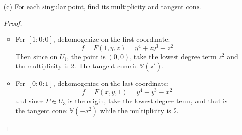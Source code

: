 \documentclass{article}
\begin{document}
\begin{itemize}
\begin{proof}
\begin{itemize}
                        \item If from $F_{x} = 0$, we get $z = 0$, then 
                            \begin{equation*}
                                F_{z}(x, y, 0) = y^{3} = 0
                            \end{equation*}
                        so $y  = 0$ also. Then the singular point is $[1 : 0 : 0]$. Notice that both $x = z = 0$ cannot be the case, because then we would get $x = y = z = 0$ which is not a point.
                    \end{itemize}
                So the singular points of $\mathbb{V}(F)$ are $[0 : 0 : 1]$ and $[1 : 0 : 0]$.
            \end{proof}

        \item [(c)] For each singular point, find its multiplicity and tangent cone. 
            \begin{proof}
                \begin{itemize}
                    \item For $[1 : 0 : 0]$, dehomogenize on the first coordinate:
                        \begin{equation*}
                            f = F(1, y, z) = y^{4} + zy^{3} - z^{2}
                        \end{equation*}
                    Then since on $U_{1}$, the point is $(0, 0)$, take the lowest degree term $z^{2}$ and the multiplicity is $2$. The tangent cone is $\mathbb{V}(z^{2})$.

                    \item For $[0 :0 : 1]$, dehomogenize on the last coordinate:
                        \begin{equation*}
                            f = F(x, y, 1) = y^{4} + y^{3} - x^{2}
                        \end{equation*}
                    and since $P \in U_{3}$ is the origin, take the lowest degree term, and that is the tangent cone: $\mathbb{V}(-x^{2})$ while the multiplicity is $2$. 
                \end{itemize}
            \end{proof}
    \end{itemize}
\end{document}
